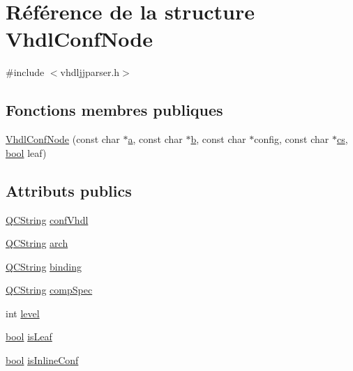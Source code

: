 \hypertarget{struct_vhdl_conf_node}{}\section{Référence de la structure Vhdl\+Conf\+Node}
\label{struct_vhdl_conf_node}


{\ttfamily \#include $<$vhdljjparser.\+h$>$}

\subsection*{Fonctions membres publiques}
\begin{DoxyCompactItemize}
\item 
\hyperlink{struct_vhdl_conf_node_a4d2fd7ffc7cc92605131ad36a1cc89d9}{Vhdl\+Conf\+Node} (const char $\ast$\hyperlink{060__command__switch_8tcl_ab08ae027fc5777bc4f0629f1b60b35db}{a}, const char $\ast$\hyperlink{060__command__switch_8tcl_a68bdb74c144118d936931c46f75d4b3e}{b}, const char $\ast$config, const char $\ast$\hyperlink{qtextcodec_8cpp_a067a00d3965ca879847daf3c8c224ee6}{cs}, \hyperlink{qglobal_8h_a1062901a7428fdd9c7f180f5e01ea056}{bool} leaf)
\end{DoxyCompactItemize}
\subsection*{Attributs publics}
\begin{DoxyCompactItemize}
\item 
\hyperlink{class_q_c_string}{Q\+C\+String} \hyperlink{struct_vhdl_conf_node_aae66e539683b80ab09430a03f6b24aae}{conf\+Vhdl}
\item 
\hyperlink{class_q_c_string}{Q\+C\+String} \hyperlink{struct_vhdl_conf_node_a5dfd0b52022b21363f60709dfce7623d}{arch}
\item 
\hyperlink{class_q_c_string}{Q\+C\+String} \hyperlink{struct_vhdl_conf_node_a0a77b95ba7755c964cee04586ea18523}{binding}
\item 
\hyperlink{class_q_c_string}{Q\+C\+String} \hyperlink{struct_vhdl_conf_node_acec3e9f2d52721d4a229c1cbf1f5c61b}{comp\+Spec}
\item 
int \hyperlink{struct_vhdl_conf_node_a3d98980a9818f52a3753602281d19b8e}{level}
\item 
\hyperlink{qglobal_8h_a1062901a7428fdd9c7f180f5e01ea056}{bool} \hyperlink{struct_vhdl_conf_node_a963695dba442c5aa442570969a61a3bc}{is\+Leaf}
\item 
\hyperlink{qglobal_8h_a1062901a7428fdd9c7f180f5e01ea056}{bool} \hyperlink{struct_vhdl_conf_node_ac5465303d990494eb98a12d4666ab368}{is\+Inline\+Conf}
\end{DoxyCompactItemize}


